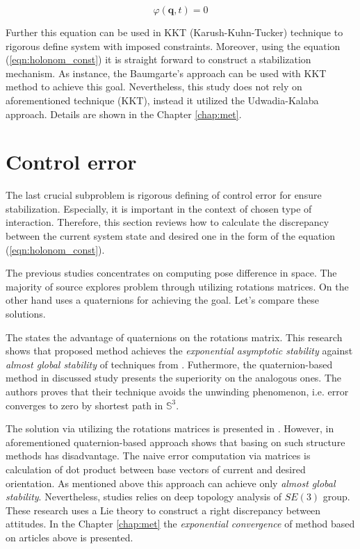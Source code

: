 \begin{equation}
    \label{eqn:holonom_const}
    \varphi (\mathbf{q}, t) = 0
\end{equation}

Further this equation can be used in KKT (Karush-Kuhn-Tucker) technique to 
rigorous define system with imposed constraints. Moreover, using the equation
(\ref{eqn:holonom_const}) it is straight forward to construct a stabilization 
mechanism. As instance, the Baumgarte's approach can be used with KKT method 
to achieve this goal. Nevertheless, this study does not rely on aforementioned 
technique (KKT), instead it utilized the Udwadia-Kalaba approach. Details are 
shown in the Chapter \ref{chap:met}.

\section{Control error} \label{sec:control_error}

The last crucial subproblem is rigorous defining of control error for ensure 
stabilization. Especially, it is important in the context of chosen type of 
interaction. Therefore, this section reviews how to calculate the discrepancy 
between the current system state and desired one in the form of the equation 
(\ref{eqn:holonom_const}). 

The previous studies \cite{SlidingOnManifoldsQuat,GeomControlQuadSE3,
RigidBodyAttCon,OutFeedbackStabForOrbRob,ANonlinearObserverUsingPose} 
concentrates on computing pose difference in space. The majority 
\cite{GeomControlQuadSE3,RigidBodyAttCon,OutFeedbackStabForOrbRob,
ANonlinearObserverUsingPose} of source explores problem through utilizing 
rotations matrices. On the other hand \cite{SlidingOnManifoldsQuat} uses 
a quaternions for achieving the goal. Let's compare these solutions.

The \cite{SlidingOnManifoldsQuat} states the advantage of quaternions on 
the rotations matrix. This research shows that proposed method achieves 
the \emph{exponential asymptotic stability} against \emph{almost global 
stability} of techniques from \cite{GeomControlQuadSE3,RigidBodyAttCon}.
Futhermore, the quaternion-based method in discussed study presents the 
superiority on the analogous ones. The authors proves that their technique 
avoids the unwinding phenomenon, i.e. error converges to zero by shortest 
path in $\mathbb{S}^3$.

The solution via utilizing the rotations matrices is presented in 
\cite{GeomControlQuadSE3,RigidBodyAttCon,OutFeedbackStabForOrbRob,
ANonlinearObserverUsingPose}. However, in aforementioned quaternion-based 
approach shows that basing on such structure methods has disadvantage. 
The naive error computation via matrices is calculation of dot product 
between base vectors of current and desired orientation. As mentioned 
above this approach can achieve only \emph{almost global stability}. 
Nevertheless, studies \cite{OutFeedbackStabForOrbRob, ANonlinearObserverUsingPose} 
relies on deep topology analysis of $SE(3)$ group. These research uses 
a Lie theory to construct a right discrepancy between attitudes. In 
the Chapter \ref{chap:met} the \emph{exponential convergence} of method 
based on articles above is presented.

